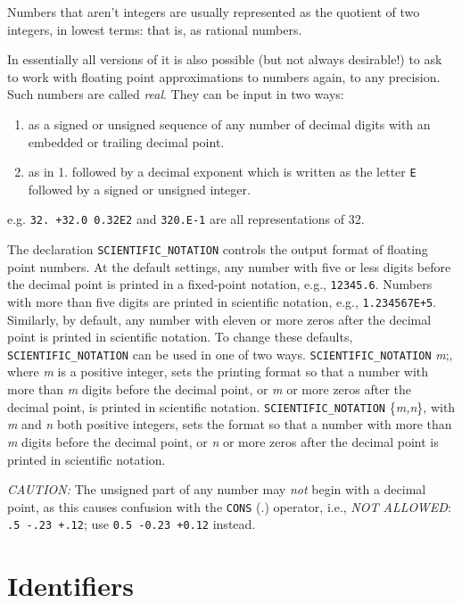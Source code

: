 Numbers that aren't integers are usually represented as the quotient of
two integers, in lowest terms: that is, as rational numbers.

In essentially all versions of {\REDUCE} it is also possible (but not always
desirable!) to ask {\REDUCE} to work with floating point approximations to
numbers again, to any precision. Such numbers are called \emph{real}.
  They can be input in two ways:
\begin{enumerate}
\item as a signed or unsigned sequence of any number of decimal digits
      with an embedded or trailing decimal point.
\item as in 1. followed by a decimal exponent which is written as the
      letter \texttt{E} followed by a signed or unsigned integer.
\end{enumerate}
e.g. \texttt{32. +32.0 0.32E2} and \texttt{320.E-1} are all representations of
32.

The declaration \texttt{SCIENTIFIC\_NOTATION}
controls the output format of floating point numbers.  At
the default settings, any number with five or less digits before the
decimal point is printed in a fixed-point notation, e.g., \texttt{12345.6}.
Numbers with more than five digits are printed in scientific notation,
e.g., \texttt{1.234567E+5}.  Similarly, by default, any number with eleven or
more zeros after the decimal point is printed in scientific notation.  To
change these defaults, \texttt{SCIENTIFIC\_NOTATION} can be used in one of two
ways. \texttt{SCIENTIFIC\_NOTATION} \emph{m};, where \emph{m} is a positive
integer, sets the printing format so that a number with more than \emph{m}
digits before the decimal point, or {\em m\/} or more zeros after the
decimal point, is printed in scientific notation. \texttt{SCIENTIFIC\_NOTATION}
\{\emph{m,n}\}, with \emph{m} and \emph{n} both positive integers, sets the
format so that a number with more than \emph{m} digits before the decimal
point, or \emph{n} or more zeros after the decimal point is printed in
scientific notation.

\textit{CAUTION:}  The unsigned part of any number may \emph{not}
begin with a decimal point, as this causes confusion with the \texttt{CONS} (.)
operator, i.e., \emph{NOT ALLOWED}: \texttt{.5  -.23  +.12};
use \texttt{0.5 -0.23 +0.12} instead.

\section{Identifiers}

